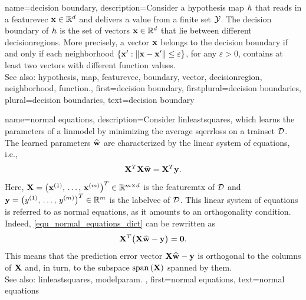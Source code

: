 {name={decision boundary}, 
	description={Consider a 
		\gls{hypothesis} \gls{map} $h$ that reads in a \gls{featurevec}  
		${\bf x} \in \mathbb{R}^{d}$ and delivers a value from a finite set $\mathcal{Y}$. 
		The decision \gls{boundary} of $h$ is the set of \glspl{vector} ${\bf x} \in \mathbb{R}^{d}$ 
		that lie between different \glspl{decisionregion}. More precisely, a 
		\gls{vector} ${\bf x}$ belongs to the decision \gls{boundary} if and only 
		if each \gls{neighborhood} $\{ {\bf x}': \| {\bf x} - {\bf x}' \| \leq \varepsilon \}$, 
		for any $\varepsilon >0$, contains at least two \glspl{vector} with different \gls{function} values.
				\\
		See also: \gls{hypothesis}, \gls{map}, \gls{featurevec}, \gls{boundary}, \gls{vector}, \gls{decisionregion}, 
		\gls{neighborhood}, \gls{function}.},
	first={decision boundary},
	firstplural={decision boundaries},
	plural={decision boundaries},
	text={decision boundary} 
}

{name={normal equations}, 
	description={Consider \gls{linleastsquares}, which learns the \glspl{parameter} of a 
		\gls{linmodel} by minimizing the average \gls{sqerrloss} on a 
		\gls{trainset} $\mathcal{D}$. 
		The learned \glspl{parameter} $\widehat{{\bf w}}$ are characterized by the 
		linear system of equations, i.e.,
		\begin{equation} 
			\label{equ_normal_equations_dict}
			{\bf X}^{T} {\bf X} \widehat{{\bf w}} = {\bf X}^{T} {\bf y}.
		\end{equation} 
		Here, ${\bf X}=\big({\bf x}^{(1)},\,\ldots,\,{\bf x}^{(m)}\big)^{T} \in \mathbb{R}^{m \times d}$ 
		is the \gls{featuremtx} of $\mathcal{D}$ and ${\bf y}=\big(y^{(1)},\,\ldots,\,y^{(m)} \big)^{T} \in \mathbb{R}^{m}$ 
		is the \gls{labelvec} of $\mathcal{D}$. This linear system of equations is referred 
		to as normal equations, as it amounts to an orthogonality condition. Indeed, \eqref{equ_normal_equations_dict} 
		can be rewritten as $$ {\bf X}^{T} \big( {\bf X} \widehat{{\bf w}} - {\bf y} \big) = \mathbf{0}.$$
		This means that the \gls{prediction} error \gls{vector} ${\bf X} \widehat{{\bf w}} - {\bf y}$ 
		is orthogonal to the columns of ${\bf X}$ and, in turn, to the \gls{subspace} ${\rm span}\left({\bf X} \right)$
		spanned by them.
		\\ 
		See also: \gls{linleastsquares}, \gls{modelparam}. },
	first={normal equations},
	text={normal equations} 
}

